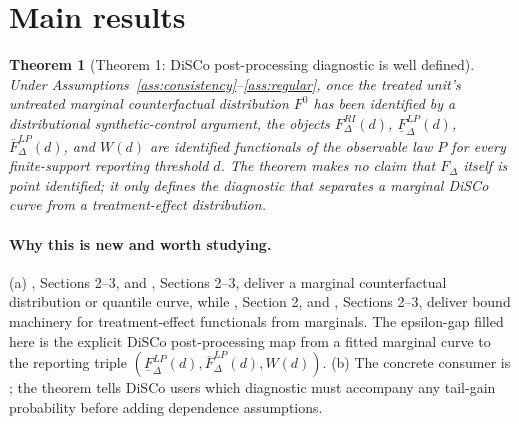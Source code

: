 \documentclass[11pt]{article}
\theoremstyle{definition}
\theoremstyle{plain}
\newtheorem{theorem}{Theorem}
\theoremstyle{remark}
\begin{document}
\section{Main results}
\begin{theorem}[Theorem 1: DiSCo post-processing diagnostic is well defined]\label{thm:marginal}
Under Assumptions~\ref{ass:consistency}--\ref{ass:regular}, once the treated unit's untreated marginal counterfactual distribution \(F^0\) has been identified by a distributional synthetic-control argument, the objects \(F^{RI}_\Delta(d)\), \(\underline F_\Delta^{LP}(d)\), \(\overline F_\Delta^{LP}(d)\), and \(W(d)\) are identified functionals of the observable law \(P\) for every finite-support reporting threshold \(d\).  The theorem makes no claim that \(F_\Delta\) itself is point identified; it only defines the diagnostic that separates a marginal DiSCo curve from a treatment-effect distribution.
\end{theorem}
\paragraph{Why this is new and worth studying.}
(a) \cite{Gunsilius2023DiSCo}, Sections 2--3, and \cite{Chen2020DistributionalSC}, Sections 2--3, deliver a marginal counterfactual distribution or quantile curve, while \cite{FanPark2010SharpBounds}, Section 2, and \cite{FirpoRidder2019Functionals}, Sections 2--3, deliver bound machinery for treatment-effect functionals from marginals.  The epsilon-gap filled here is the explicit DiSCo post-processing map from a fitted marginal curve to the reporting triple \((\underline F_\Delta^{LP}(d),\overline F_\Delta^{LP}(d),W(d))\).  (b) The concrete consumer is \cite{Gunsilius2023DiSCo}; the theorem tells DiSCo users which diagnostic must accompany any tail-gain probability before adding dependence assumptions.
\end{document}
